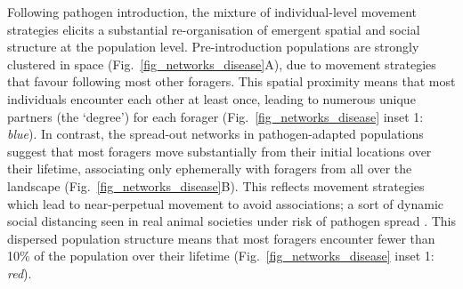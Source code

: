 Following pathogen introduction, the mixture of individual-level movement strategies elicits a substantial re-organisation of emergent spatial and social structure at the population level.
Pre-introduction populations are strongly clustered in space (Fig.~\ref{fig_networks_disease}A), due to movement strategies that favour following most other foragers.
This spatial proximity means that most individuals encounter each other at least once, leading to numerous unique partners (the `degree') for each forager (Fig.~\ref{fig_networks_disease} inset 1: \emph{blue}).
In contrast, the spread-out networks in pathogen-adapted populations suggest that most foragers move substantially from their initial locations over their lifetime, associating only ephemerally with foragers from all over the landscape (Fig.~\ref{fig_networks_disease}B).
This reflects movement strategies which lead to near-perpetual movement to avoid associations; a sort of dynamic social distancing seen in real animal societies under risk of pathogen spread \autocite{weinstein2018,stroeymeyt2018,pusceddu2021,stockmaier2021}.
This dispersed population structure means that most foragers encounter fewer than 10\% of the population over their lifetime (Fig.~\ref{fig_networks_disease} inset 1: \emph{red}).

